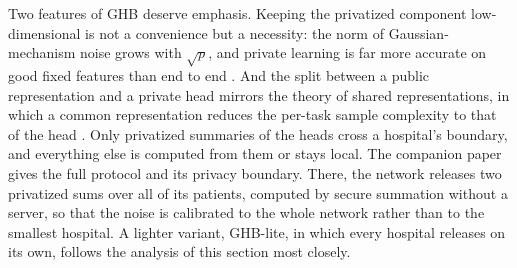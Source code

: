 \documentclass[acmsmall,screen,review]{acmart}
\theoremstyle{acmdefinition}
\begin{document}
Two features of GHB deserve emphasis. Keeping the privatized component low-dimensional is not a convenience but a necessity: the norm of Gaussian-mechanism noise grows with $\sqrt{p}$, and private learning is far more accurate on good fixed features than end to end \cite{tramer2021differentially}. And the split between a public representation and a private head mirrors the theory of shared representations, in which a common representation reduces the per-task sample complexity to that of the head \cite{collins2021exploiting,du2021few,maurer2016benefit,tripuraneni2020theory}. Only privatized summaries of the heads cross a hospital's boundary, and everything else is computed from them or stays local. The companion paper \cite{simoes2026ghb} gives the full protocol and its privacy boundary. There, the network releases two privatized sums over all of its patients, computed by secure summation without a server, so that the noise is calibrated to the whole network rather than to the smallest hospital. A lighter variant, GHB-lite, in which every hospital releases on its own, follows the analysis of this section most closely.
\end{document}
